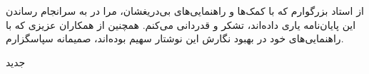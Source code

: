 


\begin{center}
\end{center}

از استاد بزرگوارم که با کمک‌ها و راهنمایی‌های بی‌دریغشان، مرا
در به سرانجام رساندن این پایان‌نامه یاری داده‌اند، تشکر و قدردانی می‌کنم.
همچنین از همکاران عزیزی که با راهنمایی‌های خود در بهبود نگارش این نوشتار
سهیم بوده‌اند، صمیمانه سپاسگزارم.

‌جدید
